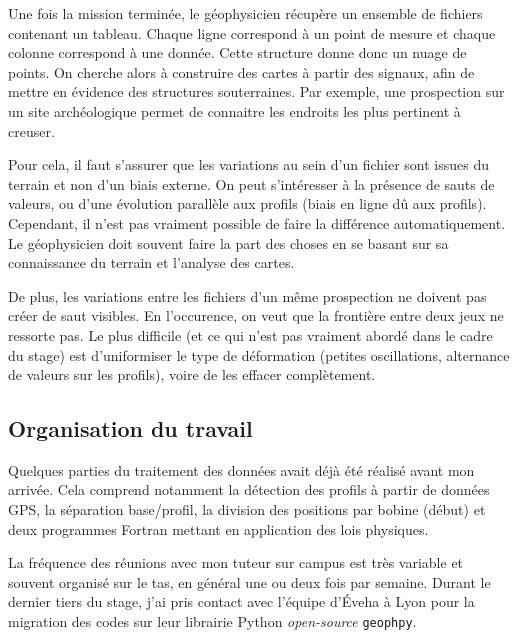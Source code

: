 \documentclass[12pt]{article}
\begin{document}
    Une fois la mission terminée, le géophysicien récupère un ensemble de fichiers contenant un tableau. Chaque ligne correspond à un point de mesure et chaque colonne correspond à une donnée. Cette structure donne donc un nuage de points. On cherche alors à construire des cartes à partir des signaux, afin de mettre en évidence des structures souterraines. Par exemple, une prospection sur un site archéologique permet de connaitre les endroits les plus pertinent à creuser.
    
    Pour cela, il faut s'assurer que les variations au sein d'un fichier sont issues du terrain et non d'un biais externe. On peut s'intéresser à la présence de sauts de valeurs, ou d'une évolution parallèle aux profils (biais en ligne dû aux profils). Cependant, il n'est pas vraiment possible de faire la différence automatiquement. Le géophysicien doit souvent faire la part des choses en se basant sur sa connaissance du terrain et l'analyse des cartes.
    
    De plus, les variations entre les fichiers d'un même prospection ne doivent pas créer de saut visibles. En l'occurence, on veut que la frontière entre deux jeux ne ressorte pas. Le plus difficile (et ce qui n'est pas vraiment abordé dans le cadre du stage) est d'uniformiser le type de déformation (petites oscillations, alternance de valeurs sur les profils), voire de les effacer complètement.


\subsection{Organisation du travail}

    Quelques parties du traitement des données avait déjà été réalisé avant mon arrivée. Cela comprend notamment la détection des profils à partir de données GPS, la séparation base/profil, la division des positions par bobine (début) et deux programmes Fortran mettant en application des lois physiques.

    La fréquence des réunions avec mon tuteur sur campus est très variable et souvent organisé sur le tas, en général une ou deux fois par semaine. Durant le dernier tiers du stage, j'ai pris contact avec l'équipe d'Éveha à Lyon pour la migration des codes sur leur librairie Python \textit{open-source} \texttt{geophpy}.
\end{document}
